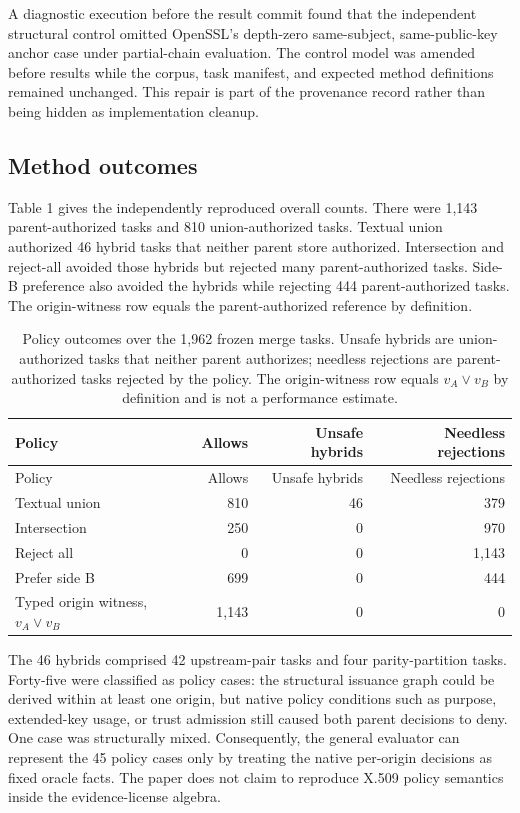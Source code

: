 \documentclass[pdflatex,sn-mathphys-num]{sn-jnl}
\begin{document}
A diagnostic execution before the result commit found that the independent structural control omitted OpenSSL's depth-zero same-subject, same-public-key anchor case under partial-chain evaluation. The control model was amended before results while the corpus, task manifest, and expected method definitions remained unchanged. This repair is part of the provenance record rather than being hidden as implementation cleanup.

\subsection{Method outcomes}\label{method-outcomes}

Table 1 gives the independently reproduced overall counts. There were 1,143 parent-authorized tasks and 810 union-authorized tasks. Textual union authorized 46 hybrid tasks that neither parent store authorized. Intersection and reject-all avoided those hybrids but rejected many parent-authorized tasks. Side-B preference also avoided the hybrids while rejecting 444 parent-authorized tasks. The origin-witness row equals the parent-authorized reference by definition.

\begin{longtable}[]{@{}lrrr@{}}
\caption{Policy outcomes over the 1,962 frozen merge tasks. Unsafe hybrids are union-authorized tasks that neither parent authorizes; needless rejections are parent-authorized tasks rejected by the policy. The origin-witness row equals \(v_A\lor v_B\) by definition and is not a performance estimate.}\tabularnewline
\toprule\noalign{}
Policy & Allows & Unsafe hybrids & Needless rejections \\
\midrule\noalign{}
\endfirsthead
\toprule\noalign{}
Policy & Allows & Unsafe hybrids & Needless rejections \\
\midrule\noalign{}
\endhead
\bottomrule\noalign{}
\endlastfoot
Textual union & 810 & 46 & 379 \\
Intersection & 250 & 0 & 970 \\
Reject all & 0 & 0 & 1,143 \\
Prefer side B & 699 & 0 & 444 \\
Typed origin witness, \(v_A\lor v_B\) & 1,143 & 0 & 0 \\
\end{longtable}

The 46 hybrids comprised 42 upstream-pair tasks and four parity-partition tasks. Forty-five were classified as policy cases: the structural issuance graph could be derived within at least one origin, but native policy conditions such as purpose, extended-key usage, or trust admission still caused both parent decisions to deny. One case was structurally mixed. Consequently, the general evaluator can represent the 45 policy cases only by treating the native per-origin decisions as fixed oracle facts. The paper does not claim to reproduce X.509 policy semantics inside the evidence-license algebra.
\end{document}
